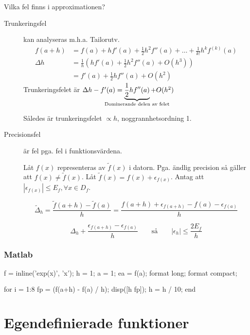 \documentclass[a4paper,10pt,swedish]{memoir}
\numberwithin{equation}{subsection}
\begin{document}
Vilka fel finns i approximationen?

\begin{description}
\item[Trunkeringsfel]
  kan analyseras m.h.a. Tailorutv.
  \begin{align}
    f(a+h) &= f(a) + h f'(a) + \frac{1}{2}h^2 f''(a) + \ldots +
    \frac{1}{k!} h^kf^{(k)}(a) \\
    \Delta h &= \frac{1}{h}\left(h f'(a) + \frac{1}{2}h^2 f''(a) +
    O\left(h^3\right)\right) \\
    &= f'(a)+\frac{1}{2}h f''(a) + O(h^2)
  \end{align}
  Trunkeringsfelet är $\Delta h - f'(a)=\underbrace{\frac{1}{2}h
    f''(a)}_{\mathclap{\text{Dominerande delen av felet}}}+O(h^2)$

  Således är trunkeringsfelet $\propto h$, noggrannhetsordning 1.
\item[Precisionsfel] är fel pga. fel i funktionsvärdena.

Låt $f(x)$ representeras av $\tilde{f}(x)$ i datorn. Pga. ändlig
precision så gäller att $f(x)\neq\tilde{f}(x)$. Låt
$\tilde{f}(x)=f(x)+\epsilon_{f(x)}$. Antag att $|\epsilon_{f(x)}|\leq
E_f, \forall x \in D_f$.

\begin{equation}
\tilde{\Delta}_h = \frac{\tilde{f}(a+h)-\tilde{f}(a)}{h} =
\frac{f(a+h) + \epsilon_{f(a+h)} - f(a) - \epsilon_{f(a)}}{h}
\end{equation}

\begin{equation}
\Delta_h + \frac{\epsilon_{f(a+h)}-\epsilon_{f(a)}}{h} \qquad
\text{så} \qquad |\epsilon_h| \leq \frac{2 E_f}{h}
\end{equation}
\end{description}

\subsubsection{Matlab}

\begin{matlabcode}
f = inline('exp(x)', 'x');
h = 1; a = 1; ea = f(a); format long; format compact;

for i = 1:8
    fp = (f(a+h) - f(a) / h);
    disp([h fp]);
    h = h / 10;
end
\end{matlabcode}

\section{Egendefinierade funktioner}
\end{document}
